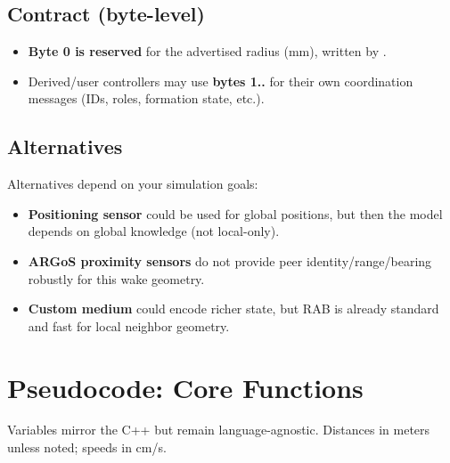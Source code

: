 \documentclass[11pt,a4paper]{article}
\newcommand{\codeid}[1]{\texttt{\seqsplit{#1}}} %
\begin{document}
\subsection{Contract (byte-level)}
\begin{itemize}
  \item \textbf{Byte 0 is reserved} for the advertised radius (mm), written by \codeid{CAirResistance}.
  \item Derived/user controllers may use \textbf{bytes 1..} for their own coordination messages (IDs, roles, formation state, etc.).
\end{itemize}

\subsection{Alternatives}
Alternatives depend on your simulation goals:
\begin{itemize}
  \item \textbf{Positioning sensor} could be used for global positions, but then the model depends on global knowledge (not local-only).
  \item \textbf{ARGoS proximity sensors} do not provide peer identity/range/bearing robustly for this wake geometry.
  \item \textbf{Custom medium} could encode richer state, but RAB is already standard and fast for local neighbor geometry.
\end{itemize}

\section{Pseudocode: Core Functions}
Variables mirror the C++ but remain language-agnostic. Distances in meters unless noted; speeds in \si{cm/s}.
\end{document}

